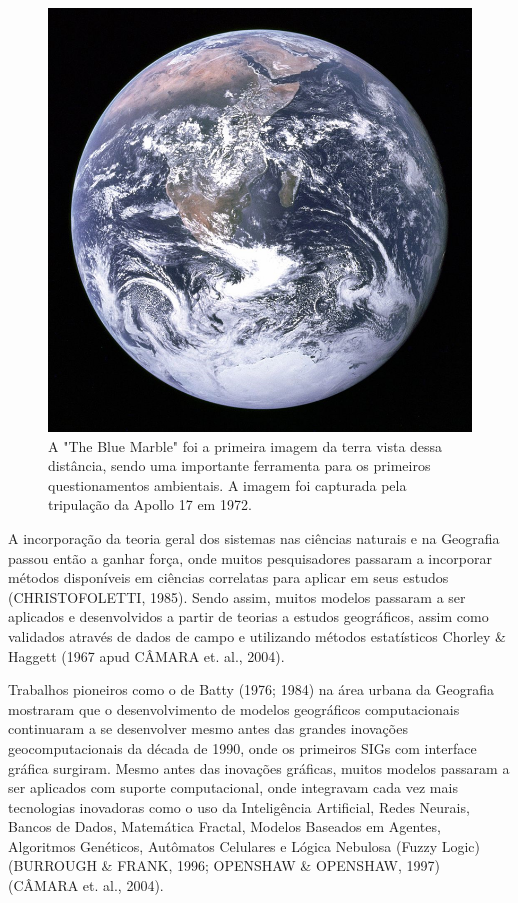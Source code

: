 	\begin{figure}
		\centering
		\includegraphics[width=0.9\linewidth]{data/blue_marble}
		\caption{A "The Blue Marble" foi a primeira imagem da terra vista dessa distância, sendo uma importante ferramenta para os primeiros questionamentos ambientais. A imagem foi capturada pela tripulação da Apollo 17 em 1972.}
		\label{fig:bluemarble}
	\end{figure}

A incorporação da teoria geral dos sistemas nas ciências naturais e na Geografia passou então a ganhar força, onde muitos pesquisadores passaram a incorporar métodos disponíveis em ciências correlatas para aplicar em seus estudos (CHRISTOFOLETTI, 1985). Sendo assim, muitos modelos passaram a ser aplicados e desenvolvidos a partir de teorias a estudos geográficos, assim como validados através de dados de campo e utilizando métodos estatísticos Chorley \& Haggett (1967 apud CÂMARA et. al., 2004).

Trabalhos pioneiros como o de Batty (1976; 1984) na área urbana da Geografia mostraram que o desenvolvimento de modelos geográficos computacionais continuaram a se desenvolver mesmo antes das grandes inovações geocomputacionais da década de 1990, onde os primeiros SIGs com interface gráfica surgiram. Mesmo antes das inovações gráficas, muitos modelos passaram a ser aplicados com suporte computacional, onde integravam cada vez mais tecnologias inovadoras como o uso da Inteligência Artificial, Redes Neurais, Bancos de Dados, Matemática Fractal, Modelos Baseados em Agentes, Algoritmos Genéticos, Autômatos Celulares e Lógica Nebulosa (Fuzzy Logic) (BURROUGH \& FRANK, 1996; OPENSHAW \& OPENSHAW, 1997) (CÂMARA et. al., 2004).

